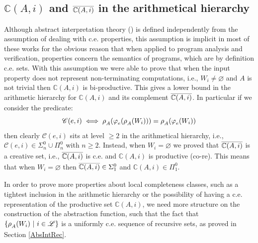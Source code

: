 \documentclass[runningheads]{llncs}
\def\ok#1{\mbox{\raisebox{0ex}[1ex][1ex]{$#1$}}}
\def\re{c.e.}
\def\grasse#1{{\llbracket #1 \rrbracket}}
\def\bbbc{{\mathbb{C}}}
\newcommand{\ccL}{\mathscr{L}}
\newcommand{\Domain}{\mathbb{D}}
\newcommand{\pfunction}[3]{\ok{\varphi^{#2\, #3}_{#1}}}
\newcommand{\auco}[2]{\ok{\rho^{#1}_{#2}}}
\newcommand{\compl}[1]{\ok{\overline{#1}}}
\newcommand{\ra}{\rightarrow}
\def\ok#1{\mbox{\raisebox{0ex}[1ex][1ex]{$#1$}}}
\def\predC{\mathscr{C}}
\def\cAA{\ensuremath{A}}
\newcommand{\sset}[2]{\{#1  ~|~ #2\}}
\def\tuple#1{\langle #1 \rangle}
\begin{document}

\subsection{$\bbbc(\cAA,i)$ and $\compl{\bbbc(\cAA,i)}$ in the arithmetical hierarchy}

Although abstract interpretation theory (\cite{CC79}) is defined independently from the assumption of dealing with {\re} properties, this assumption is implicit in most of these works for the obvious reason that when applied to program analysis and verification, properties concern the semantics of programs, which are by definition {\re} sets. With this assumption we were able to prove that when the input property does not represent non-terminating computations, i.e., $W_i\neq\varnothing$ and $\cAA$ is not trivial then $\bbbc(\cAA,i)$ is bi-productive. This gives a lower bound in the arithmetic hierarchy for $\bbbc(\cAA,i)$ and its complement $\compl{\bbbc(\cAA,i)}$. In particular if we consider the predicate:
\[
\predC(e,i) \iff \auco{}{A}(\pfunction{e}{}{}(\auco{}{A}(W_i))) = \auco{}{A}(\pfunction{e}{}{}(W_i))
\]
then clearly $\predC(e,i)$ sits at level $\geq 2$ in the arithmetical hierarchy, i.e., $\predC(e,i)\in \Sigma_{n}^0\cup\Pi_{n}^0$ with $n\geq 2$. Instead, when $W_i=\varnothing$ we proved that $\compl{\bbbc(\cAA,i)}$ is a creative set, i.e., $\compl{\bbbc(\cAA,i)}$ is {\re} and $\bbbc(\cAA,i)$ is productive (co-{re}). This means that when $W_i=\varnothing$ then $\compl{\bbbc(\cAA,i)}\in\Sigma_1^0$ and $\bbbc(\cAA,i)\in\Pi_1^0$.

In order to prove more properties about local completeness classes, such as a tightest inclusion in the arithmetic hierarchy or the possibility of having a {\re} representation of the productive set $\bbbc(\cAA,i)$, 
we need more structure on the construction of the abstraction function, such that the fact that $\sset{\auco{}{\cAA}(W_i)}{i\in\ccL}$ is a uniformly {\re} sequence of recursive sets, as proved in Section \ref{AbsIntRec}.

\end{document}
